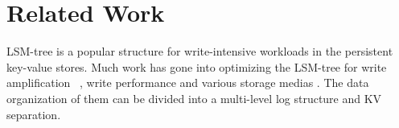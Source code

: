 \documentclass[sigconf]{acmart}
\begin{document}
\section{Related Work} \label{related}
LSM-tree \cite{LSMtree} is a popular structure for write-intensive workloads in the persistent key-value stores. Much work has gone into optimizing the LSM-tree for write amplification ~\cite{VTtree,TRIAD,PebblesDB}, write performance \cite{RocksDB,FloDB,cLSM} and various storage medias \cite{LOCS,SlimDB,NoveLSM}. The data organization of them can be divided into a multi-level log structure and KV separation.
\end{document}
